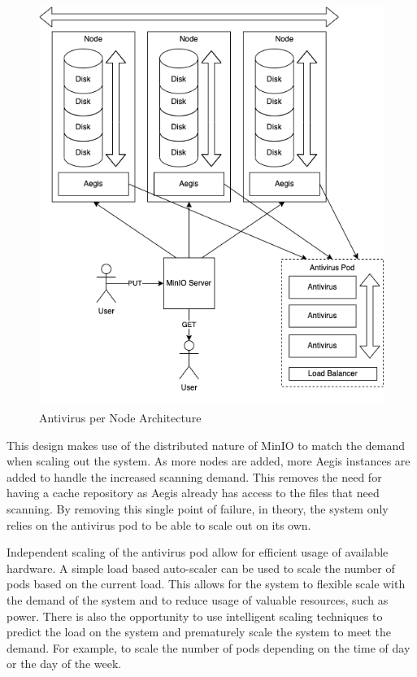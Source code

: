 \documentclass[12pt, conference, final, a4paper, onecolumn, compsoc]{IEEEtran}
\begin{document}
    \begin{figure}
      \centering \includegraphics[scale=.3]{diagrams/per-node.png}
      \caption{Antivirus per Node Architecture}
      \label{fig:perNodeArch}
    \end{figure}

    This design makes use of the distributed nature of MinIO to match the demand
    when scaling out the system. As more nodes are added, more Aegis instances
    are added to handle the increased scanning demand. This removes the need for
    having a cache repository as Aegis already has access to the files that need
    scanning. By removing this single point of failure, in theory, the system
    only relies on the antivirus pod to be able to scale out on its own.

    Independent scaling of the antivirus pod allow for efficient usage of
    available hardware. A simple load based auto-scaler can be used to scale the
    number of pods based on the current load. This allows for the system to
    flexible scale with the demand of the system and to reduce usage of valuable
    resources, such as power. There is also the opportunity to use intelligent
    scaling techniques to predict the load on the system and prematurely scale
    the system to meet the demand. For example, to scale the number of pods
    depending on the time of day or the day of the week.
\end{document}
